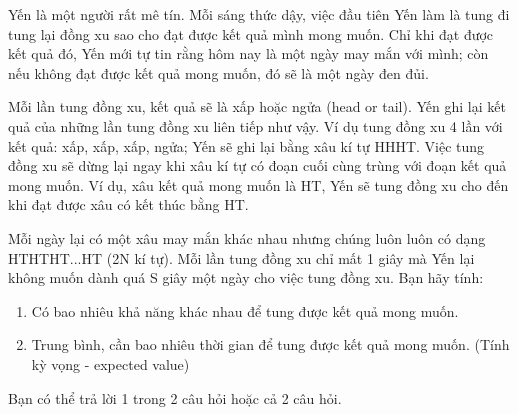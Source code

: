 Yến là một người rất mê tín. Mỗi sáng thức dậy, việc đầu tiên Yến làm là tung đi tung lại đồng xu sao cho đạt được kết quả mình mong muốn. Chỉ khi đạt được kết quả đó, Yến mới tự tin rằng hôm nay là một ngày may mắn với mình; còn nếu không đạt được kết quả mong muốn, đó sẽ là một ngày đen đủi.

Mỗi lần tung đồng xu, kết quả sẽ là xấp hoặc ngửa (head or tail). Yến ghi lại kết quả của những lần tung đồng xu liên tiếp như vậy. Ví dụ tung đồng xu 4 lần với kết quả: xấp, xấp, xấp, ngửa; Yến sẽ ghi lại bằng xâu kí tự HHHT. Việc tung đồng xu sẽ dừng lại ngay khi xâu kí tự có đoạn cuối cùng trùng với đoạn kết quả mong muốn. Ví dụ, xâu kết quả mong muốn là HT, Yến sẽ tung đồng xu cho đến khi đạt được xâu có kết thúc bằng HT.

Mỗi ngày lại có một xâu may mắn khác nhau nhưng chúng luôn luôn có dạng HTHTHT...HT (2N kí tự). Mỗi lần tung đồng xu chỉ mất 1 giây mà Yến lại không muốn dành quá S giây một ngày cho việc tung đồng xu. Bạn hãy tính:
\begin{enumerate}
	\item Có bao nhiêu khả năng khác nhau để tung được kết quả mong muốn.
	\item Trung bình, cần bao nhiêu thời gian để tung được kết quả mong muốn. (Tính kỳ vọng - expected value)
\end{enumerate}

Bạn có thể trả lời 1 trong 2 câu hỏi hoặc cả 2 câu hỏi.